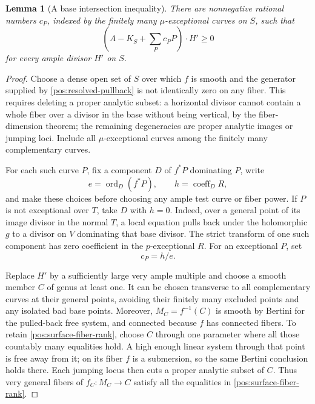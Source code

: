 \documentclass[11pt,letterpaper]{article}
\DeclareMathOperator{\ord}{ord}
\newtheorem{lemma}[theorem]{Lemma}
\theoremstyle{definition}
\theoremstyle{remark}
\begin{document}
\begin{lemma}[A base intersection inequality]\label{pos:surface-inequality}
There are nonnegative rational numbers \(c_P\), indexed by the
finitely many \(\mu\)-exceptional curves on \(S\), such that
\begin{equation}\label{pos:surface-intersection}
 \left(A-K_S+\sum_Pc_PP\right)\cdot H'\geq0
\end{equation}
for every ample divisor \(H'\) on \(S\).
\end{lemma}

\begin{proof}
Choose a dense open set of \(S\) over which \(f\) is smooth and the
generator supplied by \eqref{pos:resolved-pullback} is not identically
zero on any fiber. This requires deleting a proper analytic subset:
a horizontal divisor cannot contain a whole fiber over a divisor in
the base without being vertical, by the fiber-dimension theorem; the
remaining degeneracies are proper analytic images or jumping loci.
Include all \(\mu\)-exceptional curves among the finitely many
complementary curves.

For each such curve \(P\), fix a component \(D\) of \(f^*P\)
dominating \(P\), write
\[
 e=\ord_D(f^*P),\qquad h=\operatorname{coeff}_D R,
\]
and make these choices before choosing any ample test curve or fiber
power. If \(P\) is not exceptional over \(T\), take \(D\) with
\(h=0\). Indeed, over a general point of its image divisor in the
normal \(T\), a local equation pulls back under the holomorphic
\(g\) to a divisor on \(V\) dominating that base divisor. The strict
transform of one such component has zero coefficient in the
\(p\)-exceptional \(R\). For an exceptional \(P\), set
\begin{equation}\label{pos:exceptional-pole-allowance}
 c_P=h/e.
\end{equation}

Replace \(H'\) by a sufficiently large very ample multiple and choose
a smooth member \(C\) of genus at least one. It can be chosen
transverse to all complementary curves at their general points,
avoiding their finitely many excluded points and any isolated bad
base points. Moreover, \(M_C=f^{-1}(C)\) is smooth by Bertini for
the pulled-back free system, and connected because \(f\) has connected
fibers. To retain \eqref{pos:surface-fiber-rank}, choose \(C\) through
one parameter where all those countably many equalities hold. A high
enough linear system through that point is free away from it; on its
fiber \(f\) is a submersion, so the same Bertini conclusion holds
there. Each jumping locus then cuts a proper analytic subset of
\(C\). Thus very general fibers of \(f_C:M_C\to C\) satisfy all
the equalities in \eqref{pos:surface-fiber-rank}.


\end{proof}
\end{document}
